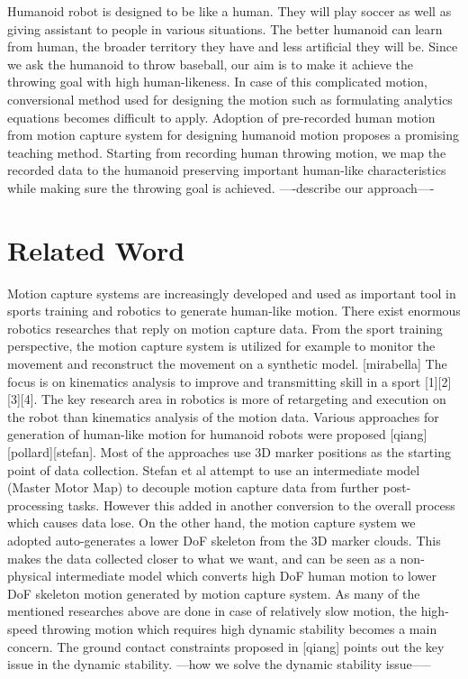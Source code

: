 Humanoid robot is designed to be like a human. They will play soccer as well as giving assistant to people in various situations. The better humanoid can learn from human, the broader territory they have and less artificial they will be. Since we ask the humanoid to throw baseball, our aim is to make it achieve the throwing goal with high human-likeness. In case of this complicated motion, conversional method used for designing the motion such as formulating analytics equations becomes difficult to apply. Adoption of pre-recorded human motion from motion capture system for designing humanoid motion proposes a promising teaching method. Starting from recording human throwing motion, we map the recorded data to the humanoid preserving important human-like characteristics while making sure the throwing goal is achieved.
----describe our approach----

\section{Related Word}
Motion capture systems are increasingly developed and used as important tool in sports training and robotics to generate human-like motion.  There exist enormous robotics researches that reply on motion capture data.  From the sport training perspective, the motion capture system is utilized for example to monitor the movement and reconstruct the movement on a synthetic model. [mirabella]  The focus is on kinematics analysis to improve and transmitting skill in a sport [1][2][3][4]. The key research area in robotics is more of retargeting and execution on the robot than kinematics analysis of the motion data.    
Various approaches for generation of human-like motion for humanoid robots were proposed [qiang][pollard][stefan]. Most of the approaches use 3D marker positions as the starting point of data collection. Stefan et al attempt to use an intermediate model (Master Motor Map) to decouple motion capture data from further post-processing tasks. However this added in another conversion to the overall process which causes data lose. On the other hand, the motion capture system we adopted auto-generates a lower DoF skeleton from the 3D marker clouds. This makes the data collected closer to what we want, and can be seen as a non-physical intermediate model which converts high DoF human motion to lower DoF skeleton motion generated by motion capture system. 
As many of the mentioned researches above are done in case of relatively slow motion, the high-speed throwing motion which requires high dynamic stability becomes a main concern. The ground contact constraints proposed in [qiang] points out the key issue in the dynamic stability. ---how we solve the dynamic stability issue-----   
